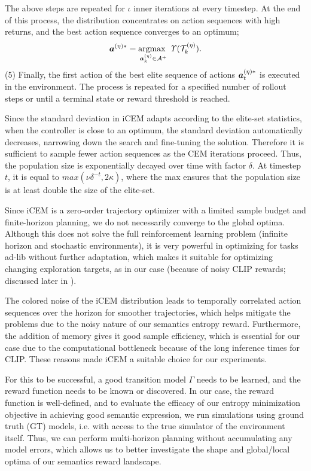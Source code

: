 The above steps are repeated for \(\iota\) inner iterations at every timestep.
At the end of this process, the distribution concentrates on action sequences with high returns, and the best action sequence converges to an optimum;
\begin{equation}
    \label{eq:planning-goal}
    \bm{a}^{(\eta)*} = \operatorname*{argmax~}_{\bm{a}^{(\eta)}_k \in \mathcal{A}^+} \mathit{\Upsilon}(\mathcal{T}^{(\eta)}_k).
\end{equation}
(5) Finally, the first action of the best elite sequence of actions \(\bm{a}^{(\eta)*}_t\) is executed in the environment.
The process is repeated for a specified number of rollout steps or until a terminal state or reward threshold is reached.

Since the standard deviation in iCEM adapts according to the elite-set statistics, when the controller is close to an optimum, the standard deviation automatically decreases, narrowing down the search and fine-tuning the solution.
Therefore it is sufficient to sample fewer action sequences as the CEM iterations proceed.
Thus, the population size is exponentially decayed over time with factor \(\delta\). 
At timestep \(t\), it is equal to \(max(\nu \delta^{-t}, 2\kappa)\), where the max ensures that the population size is at least double the size of the elite-set.

Since iCEM is a zero-order trajectory optimizer with a limited sample budget and finite-horizon planning, we do not necessarily converge to the global optima.
Although this does not solve the full reinforcement learning problem (infinite horizon and stochastic environments), it is very powerful in optimizing for tasks ad-lib without further adaptation, which makes it suitable for optimizing changing exploration targets, as in our case (because of noisy CLIP rewards; discussed later in ).

The colored noise of the iCEM distribution leads to temporally correlated action sequences over the horizon for smoother trajectories, which helps mitigate the problems due to the noisy nature of our semantics entropy reward.
Furthermore, the addition of memory gives it good sample efficiency, which is essential for our case due to the computational bottleneck because of the long inference times for CLIP.
These reasons made iCEM a suitable choice for our experiments.

For this to be successful, a good transition model \(\Gamma\) needs to be learned, and the reward function needs to be known or discovered.
In our case, the reward function is well-defined, and to evaluate the efficacy of our entropy minimization objective in achieving good semantic expression,
we run simulations using ground truth (GT) models, i.e. with access to the true simulator of the environment itself.
Thus, we can perform multi-horizon planning without accumulating any model errors, which allows us to better investigate the shape and global/local optima of our semantics reward landscape. 

